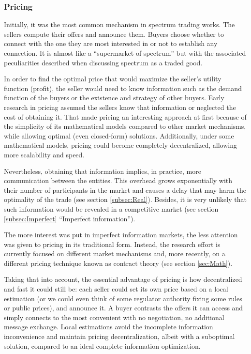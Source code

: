 \subsubsection{Pricing}
Initially, it was the most common mechanism in spectrum trading works. The sellers compute their offers and announce them. Buyers choose whether to connect with the one they are most interested in or not to establish any connection. It is almost like a ``supermarket of spectrum'' but with the associated peculiarities described when discussing spectrum as a traded good. 

In order to find the optimal price that would maximize the seller's utility function (profit), the seller would need to know information such as the demand function of the buyers or the existence and strategy of other buyers. Early research in pricing assumed the sellers know that information or neglected the cost of obtaining it. That made pricing an interesting approach at first because of 
the simplicity of its mathematical models compared to other market mechanisms, while allowing optimal (even closed-form) solutions. Additionally, under some mathematical models, pricing could become completely decentralized, allowing more scalability and speed.

Nevertheless, obtaining that information implies, in practice, more communication between the entities. This overhead grows exponentially with their number of participants in the market and causes a delay that may harm the optimality of the trade (see section \ref{subsec:Real}). Besides, it is very unlikely that such information would be revealed in a competitive market (see section \ref{subsec:Imperfect} ``Imperfect information''). 

The more interest was put in imperfect information markets, the less attention was given to pricing in its traditional form. Instead, the research effort is currently focused on different market mechanisms and, more recently, on a different pricing technique known as contract theory (see section \ref{sec:Math}).

Taking that into account, the essential advantage of pricing is how decentralized and fast it could still be: each seller could set its own price based on a local estimation (or we could even think of some regulator authority fixing some rules or public prices), and announce it. A buyer contrasts the offers it can access and simply connects to the most convenient with no negotiation, no additional message exchange. Local estimations avoid the incomplete information inconvenience and maintain pricing decentralization, albeit with a suboptimal solution, compared to an ideal complete information optimization. 

